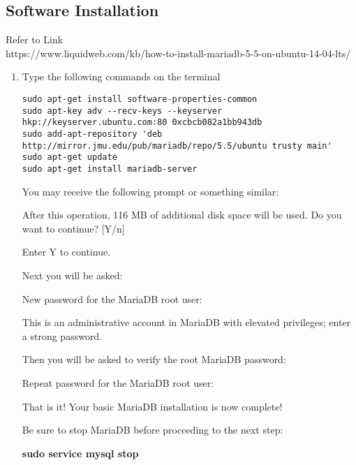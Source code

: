 \documentclass[journal,12pt,twocolumn]{IEEEtran}
\begin{document}
\subsection{\textbf{Software Installation}}
Refer to Link
\\
https://www.liquidweb.com/kb/how-to-install-mariadb-5-5-on-ubuntu-14-04-lts/
\begin{enumerate}

\item Type the following commands on the terminal
\begin{lstlisting}
sudo apt-get install software-properties-common
sudo apt-key adv --recv-keys --keyserver hkp://keyserver.ubuntu.com:80 0xcbcb082a1bb943db
sudo add-apt-repository 'deb http://mirror.jmu.edu/pub/mariadb/repo/5.5/ubuntu trusty main'
sudo apt-get update
sudo apt-get install mariadb-server
\end{lstlisting}

%

%


%

%
%
You may receive the following prompt or something similar:

After this operation, 116 MB of additional disk space will be used.
Do you want to continue? [Y/n]

Enter Y to continue.

Next you will be asked:

New password for the MariaDB root user:

This is an administrative account in MariaDB with elevated privileges; enter a strong password.

Then you will be asked to verify the root MariaDB password:

Repeat password for the MariaDB root user:

That is it! Your basic MariaDB installation is now complete!

Be sure to stop MariaDB before proceeding to the next step:

\textbf{sudo service mysql stop}

\end{enumerate}
\end{document}

